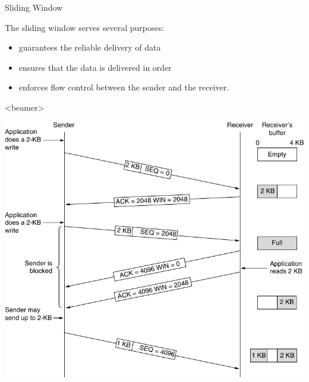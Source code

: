 \begin{frame}{Sliding Window}
  \begin{center}
  \end{center}
  \begin{iblock}{The sliding window serves several purposes:}
    \begin{itemize}
    \item guarantees the reliable delivery of data
    \item ensures that the data is delivered in order
    \item enforces flow control between the sender and the receiver.
    \end{itemize}
  \end{iblock}
\end{frame}

\begin{frame}<beamer>
  \begin{center}
    \includegraphics[height=\textheight]{slidingwindow-ast}
  \end{center}
\end{frame}

